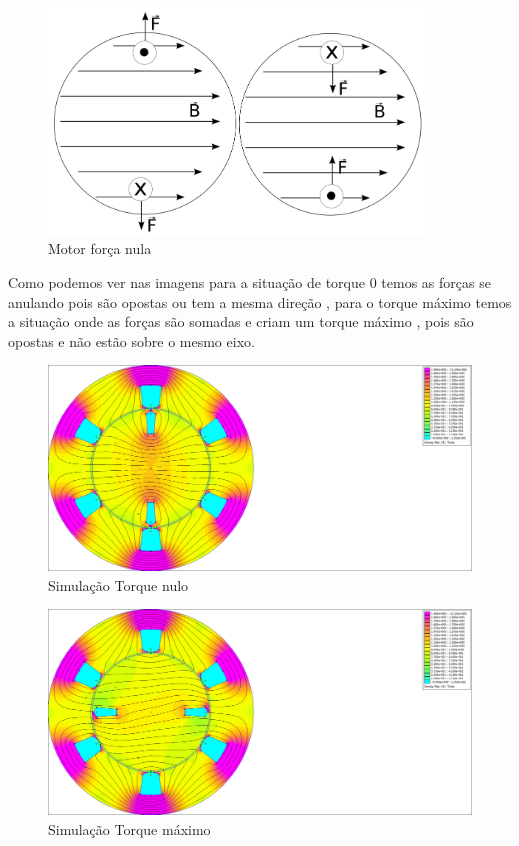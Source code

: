 \documentclass[
	12pt,				%
	openright,			%
	twoside,			%
	a4paper,			%
	english,			%
	french,				%
	spanish,			%
	brazil,				%
	]{abntex2}
\begin{document}
\begin{figure}[H]
    \centering
    \includegraphics[width=10cm]{img/Motor_forca_min.png}
    \caption{Motor força nula}
    \label{fig:motor_nulo}
\end{figure}


Como podemos ver nas imagens  para  a situação de torque 0 temos as forças se anulando pois são opostas ou tem a mesma direção , para o torque máximo temos a situação onde as forças são somadas e criam um torque máximo , pois são opostas e não  estão sobre o mesmo eixo.

\begin{figure}[H]
    \centering
    \includegraphics[width=15cm]{img/img_090.png}
    \caption{Simulação Torque nulo}
\end{figure}

\begin{figure}[H]
    \centering
    \includegraphics[width=15cm]{img/img_180.png}
    \caption{Simulação Torque máximo}
\end{figure}
\end{document}
